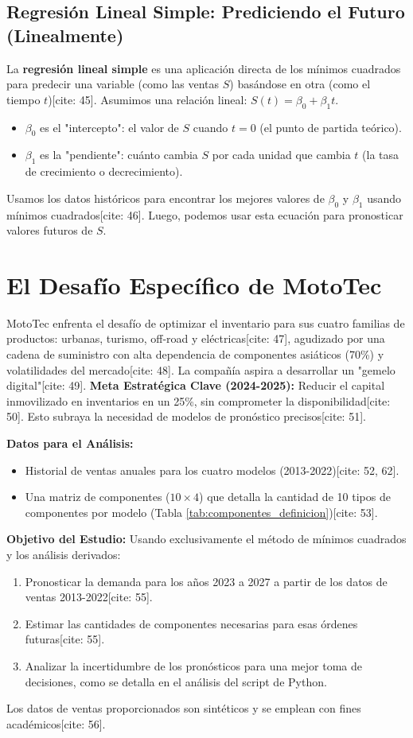 \documentclass[12pt,a4paper]{article}
\begin{document}
\subsection{Regresión Lineal Simple: Prediciendo el Futuro (Linealmente)}
La \textbf{regresión lineal simple} es una aplicación directa de los mínimos cuadrados para predecir una variable (como las ventas $S$) basándose en otra (como el tiempo $t$)[cite: 45]. Asumimos una relación lineal: $S(t) = \beta_0 + \beta_1 t$.
\begin{itemize}
    \item $\beta_0$ es el "intercepto": el valor de $S$ cuando $t=0$ (el punto de partida teórico).
    \item $\beta_1$ es la "pendiente": cuánto cambia $S$ por cada unidad que cambia $t$ (la tasa de crecimiento o decrecimiento).
\end{itemize}
Usamos los datos históricos para encontrar los mejores valores de $\beta_0$ y $\beta_1$ usando mínimos cuadrados[cite: 46]. Luego, podemos usar esta ecuación para pronosticar valores futuros de $S$.

\newpage %
\section{El Desafío Específico de MotoTec}
MotoTec enfrenta el desafío de optimizar el inventario para sus cuatro familias de productos: urbanas, turismo, off-road y eléctricas[cite: 47], agudizado por una cadena de suministro con alta dependencia de componentes asiáticos (70\%) y volatilidades del mercado[cite: 48]. La compañía aspira a desarrollar un "gemelo digital"[cite: 49].
\textbf{Meta Estratégica Clave (2024-2025):} Reducir el capital inmovilizado en inventarios en un 25\%, sin comprometer la disponibilidad[cite: 50]. Esto subraya la necesidad de modelos de pronóstico precisos[cite: 51].

\textbf{Datos para el Análisis:}
\begin{itemize}
    \item Historial de ventas anuales para los cuatro modelos (2013-2022)[cite: 52, 62].
    \item Una matriz de componentes ($10 \times 4$) que detalla la cantidad de 10 tipos de componentes por modelo (Tabla \ref{tab:componentes_definicion})[cite: 53].
\end{itemize}
\textbf{Objetivo del Estudio:}
Usando exclusivamente el método de mínimos cuadrados y los análisis derivados:
\begin{enumerate}
    \item Pronosticar la demanda para los años 2023 a 2027 a partir de los datos de ventas 2013-2022[cite: 55].
    \item Estimar las cantidades de componentes necesarias para esas órdenes futuras[cite: 55].
    \item Analizar la incertidumbre de los pronósticos para una mejor toma de decisiones, como se detalla en el análisis del script de Python.
\end{enumerate}
Los datos de ventas proporcionados son sintéticos y se emplean con fines académicos[cite: 56].
\end{document}
